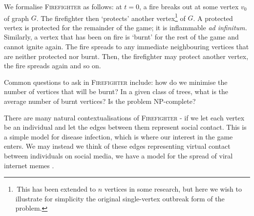 \documentclass[../report.tex]{subfiles}
\begin{document}
We formalise {\scshape Firefighter} as follows: at $t=0$, a fire breaks out at some vertex $v_0$ of graph $G$. The firefighter then `protects' another vertex\footnote{\,This has been extended to $n$ vertices in some research, but here we wish to illustrate for simplicity the original single-vertex outbreak form of the problem.} of $G$. A protected vertex is protected for the remainder of the game; it is inflammable \textit{ad infinitum.} Similarly, a vertex that has been on fire is `burnt' for the rest of the game and cannot ignite again. The fire spreads to any immediate neighbouring vertices that are neither protected nor burnt. Then, the firefighter may protect another vertex, the fire spreads again and so on. 
%

Common questions to ask in {\scshape Firefighter} include: how do we minimise the number of vertices that will be burnt? In a given class of trees, what is the average number of burnt vertices? Is the problem NP-complete?

There are many natural contextualisations of {\scshape Firefighter} - if we let each vertex be an individual and let the edges between them represent social contact. This is a simple model for disease infection, which is where our interest in the game enters. We may instead we think of these edges representing virtual contact between individuals on social media, we have a model for the spread of viral internet memes \cite{obrien_2019}.
\end{document}
